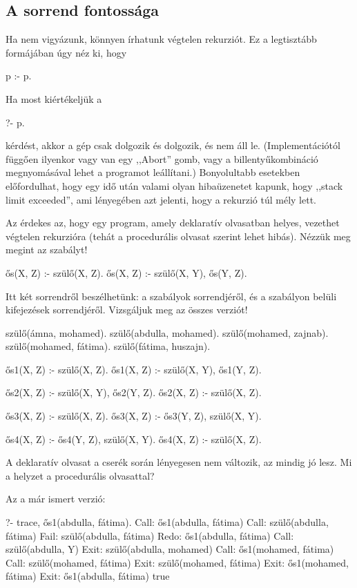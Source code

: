 \subsection*{A sorrend fontossága}

Ha nem vigyázunk, könnyen írhatunk végtelen rekurziót. Ez a legtisztább formájában úgy néz ki, hogy
\begin{program}
p :- p.
\end{program}

Ha most kiértékeljük a
\begin{query}
?- p.
\end{query}
kérdést, akkor a gép csak dolgozik és dolgozik, és
nem áll le. (Implementációtól függően ilyenkor vagy
van egy ,,Abort'' gomb, vagy a 
billentyűkombináció megnyomásával lehet a programot
leállítani.) Bonyolultabb esetekben előfordulhat,
hogy egy idő után valami olyan hibaüzenetet kapunk,
hogy ,,stack limit exceeded'', ami lényegében azt
jelenti, hogy a rekurzió túl mély lett.

Az érdekes az, hogy egy program, amely deklaratív
olvasatban helyes, vezethet végtelen rekurzióra
(tehát a procedurális olvasat szerint lehet hibás). Nézzük
meg megint az  szabályt!
\begin{program}
ős(X, Z) :- szülő(X, Z).
ős(X, Z) :- szülő(X, Y), ős(Y, Z).
\end{program}
Itt két sorrendről beszélhetünk: a szabályok
sorrendjéről, és a szabályon belüli kifejezések
sorrendjéről. Vizsgáljuk meg az összes verziót!
\begin{program}
szülő(ámna, mohamed).
szülő(abdulla, mohamed).
szülő(mohamed, zajnab).
szülő(mohamed, fátima).
szülő(fátima, huszajn).

ős1(X, Z) :- szülő(X, Z).
ős1(X, Z) :- szülő(X, Y), ős1(Y, Z).

ős2(X, Z) :- szülő(X, Y), ős2(Y, Z).
ős2(X, Z) :- szülő(X, Z).

ős3(X, Z) :- szülő(X, Z).
ős3(X, Z) :- ős3(Y, Z), szülő(X, Y).

ős4(X, Z) :- ős4(Y, Z), szülő(X, Y).
ős4(X, Z) :- szülő(X, Z).
\end{program}
A deklaratív olvasat a cserék során lényegesen nem
változik, az mindig jó lesz. Mi a helyzet a
procedurális olvasattal?

Az  a már ismert verzió:
\begin{query}
?- trace, ős1(abdulla, fátima).
Call: ős1(abdulla, fátima)
  Call: szülő(abdulla, fátima)
  Fail: szülő(abdulla, fátima)
Redo: ős1(abdulla, fátima)
  Call: szülő(abdulla, Y)
  Exit: szülő(abdulla, mohamed)
  Call: ős1(mohamed, fátima)
    Call: szülő(mohamed, fátima)
    Exit: szülő(mohamed, fátima)
  Exit: ős1(mohamed, fátima)
Exit: ős1(abdulla, fátima)
true
\end{query}

